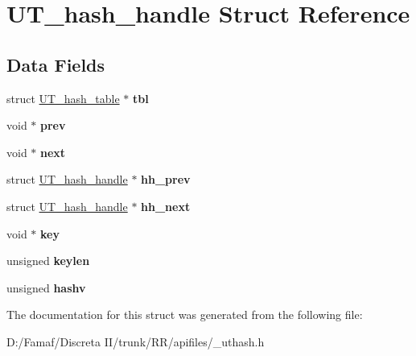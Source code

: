 \hypertarget{struct_u_t__hash__handle}{\section{U\+T\+\_\+hash\+\_\+handle Struct Reference}
\label{struct_u_t__hash__handle}
}
\subsection*{Data Fields}
\begin{DoxyCompactItemize}
\item 
\hypertarget{struct_u_t__hash__handle_af0deeb3fe5f35a4c85d105090b498c8d}{struct \hyperlink{struct_u_t__hash__table}{U\+T\+\_\+hash\+\_\+table} $\ast$ {\bfseries tbl}}\label{struct_u_t__hash__handle_af0deeb3fe5f35a4c85d105090b498c8d}

\item 
\hypertarget{struct_u_t__hash__handle_af714e69444763fb9a76ec901a014baf1}{void $\ast$ {\bfseries prev}}\label{struct_u_t__hash__handle_af714e69444763fb9a76ec901a014baf1}

\item 
\hypertarget{struct_u_t__hash__handle_a75b19ffcca77bfc647ff02695958fd95}{void $\ast$ {\bfseries next}}\label{struct_u_t__hash__handle_a75b19ffcca77bfc647ff02695958fd95}

\item 
\hypertarget{struct_u_t__hash__handle_a079301c7093356547fb4601a85503c01}{struct \hyperlink{struct_u_t__hash__handle}{U\+T\+\_\+hash\+\_\+handle} $\ast$ {\bfseries hh\+\_\+prev}}\label{struct_u_t__hash__handle_a079301c7093356547fb4601a85503c01}

\item 
\hypertarget{struct_u_t__hash__handle_a42ef2993dcaaebd656c4a40d174e0c78}{struct \hyperlink{struct_u_t__hash__handle}{U\+T\+\_\+hash\+\_\+handle} $\ast$ {\bfseries hh\+\_\+next}}\label{struct_u_t__hash__handle_a42ef2993dcaaebd656c4a40d174e0c78}

\item 
\hypertarget{struct_u_t__hash__handle_ab5c000aec752f2206131e183daf5efbf}{void $\ast$ {\bfseries key}}\label{struct_u_t__hash__handle_ab5c000aec752f2206131e183daf5efbf}

\item 
\hypertarget{struct_u_t__hash__handle_a4563ea2b1ae1597aa9fd62e005d447b4}{unsigned {\bfseries keylen}}\label{struct_u_t__hash__handle_a4563ea2b1ae1597aa9fd62e005d447b4}

\item 
\hypertarget{struct_u_t__hash__handle_ae73531e09ac884600d96a71ad9afbfa4}{unsigned {\bfseries hashv}}\label{struct_u_t__hash__handle_ae73531e09ac884600d96a71ad9afbfa4}

\end{DoxyCompactItemize}


The documentation for this struct was generated from the following file\+:\begin{DoxyCompactItemize}
\item 
D\+:/\+Famaf/\+Discreta I\+I/trunk/\+R\+R/apifiles/\+\_\+uthash.\+h\end{DoxyCompactItemize}
